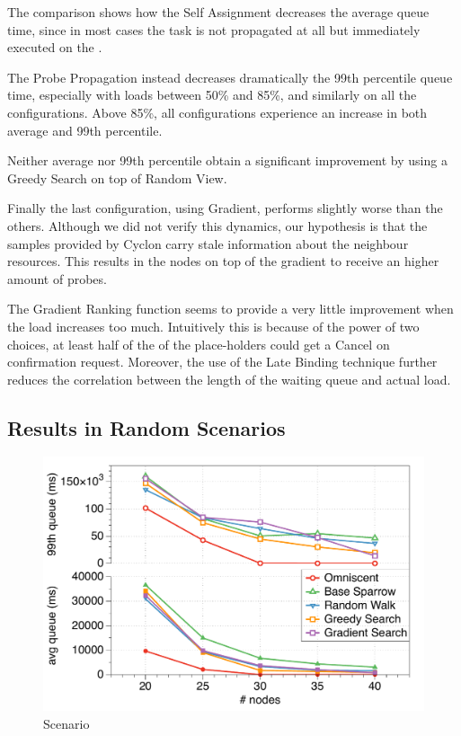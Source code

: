 \documentclass[conference]{IEEEtran}
\begin{document}
  The comparison shows how the Self Assignment decreases the average queue
  time, since in most cases the task is not propagated at all but
  immediately executed on the \tmast.

  The Probe Propagation instead decreases dramatically the 99th percentile
  queue time, especially with loads between 50\% and 85\%, and similarly on
  all the configurations. Above 85\%, all configurations experience an
  increase in both average and 99th percentile. 

  Neither average nor 99th percentile obtain a significant improvement by
  using a Greedy Search on top of Random View.

  Finally the last configuration, using Gradient, performs slightly worse
  than the others. Although we did not verify this dynamics, our hypothesis
  is that the samples provided by Cyclon carry stale information about the
  neighbour resources. This results in the nodes on top of the gradient to
  receive an higher amount of probes. 

  The Gradient Ranking function seems to provide a very little improvement
  when the load increases too much. Intuitively this is because of the power
  of two choices, at least half of the of the place-holders could get a
  Cancel on confirmation request. Moreover, the use of the Late Binding
  technique further reduces the correlation between the length of the
  waiting queue and actual load.

\subsection{Results in Random Scenarios}

  \begin{figure}
  \begin{center}
  \includegraphics[width=.5\textwidth]{figures/randomA}
  \caption{Scenario }
  \label{fig:comparison}
  \end{center}
  \end{figure}
\end{document}
